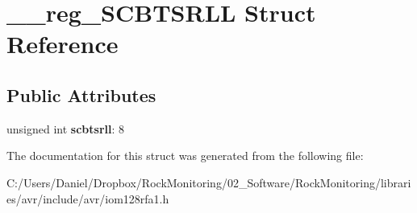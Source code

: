 \hypertarget{struct____reg___s_c_b_t_s_r_l_l}{}\section{\+\_\+\+\_\+reg\+\_\+\+S\+C\+B\+T\+S\+R\+LL Struct Reference}
\label{struct____reg___s_c_b_t_s_r_l_l}
\subsection*{Public Attributes}
\begin{DoxyCompactItemize}
\item 
unsigned int {\bfseries scbtsrll}\+: 8\hypertarget{struct____reg___s_c_b_t_s_r_l_l_a1faef415f696e903196ddde5b4c5e7c6}{}\label{struct____reg___s_c_b_t_s_r_l_l_a1faef415f696e903196ddde5b4c5e7c6}

\end{DoxyCompactItemize}


The documentation for this struct was generated from the following file\+:\begin{DoxyCompactItemize}
\item 
C\+:/\+Users/\+Daniel/\+Dropbox/\+Rock\+Monitoring/02\+\_\+\+Software/\+Rock\+Monitoring/libraries/avr/include/avr/iom128rfa1.\+h\end{DoxyCompactItemize}
